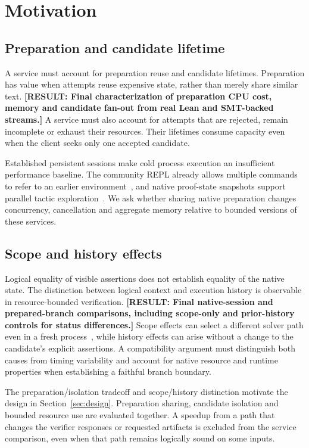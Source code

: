 \documentclass[10pt,twocolumn]{article}
\newcommand{\missing}[1]{\textbf{[RESULT: #1]}}
\begin{document}
\section{Motivation}\label{sec:motivation}
\subsection{Preparation and candidate lifetime}
A service must account for preparation reuse and candidate lifetimes. Preparation has value when attempts reuse expensive state, rather than merely share similar text. \missing{Final characterization of preparation CPU cost, memory and candidate fan-out from real Lean and SMT-backed streams.} A service must also account for attempts that are rejected, remain incomplete or exhaust their resources. Their lifetimes consume capacity even when the client seeks only one accepted candidate.

Established persistent sessions make cold process execution an insufficient performance baseline. The community REPL already allows multiple commands to refer to an earlier environment~\cite{repl}, and native proof-state snapshots support parallel tactic exploration~\cite{leanSnapshot}. We ask whether sharing native preparation changes concurrency, cancellation and aggregate memory relative to bounded versions of these services.

\subsection{Scope and history effects}
Logical equality of visible assertions does not establish equality of the native state. The distinction between logical context and execution history is observable in resource-bounded verification. \missing{Final native-session and prepared-branch comparisons, including scope-only and prior-history controls for status differences.} Scope effects can select a different solver path even in a fresh process~\cite{z3api}, while history effects can arise without a change to the candidate's explicit assertions. A compatibility argument must distinguish both causes from timing variability and account for native resource and runtime properties when establishing a faithful branch boundary.

The preparation/isolation tradeoff and scope/history distinction motivate the design in Section~\ref{sec:design}. Preparation sharing, candidate isolation and bounded resource use are evaluated together. A speedup from a path that changes the verifier responses or requested artifacts is excluded from the service comparison, even when that path remains logically sound on some inputs.
\end{document}
